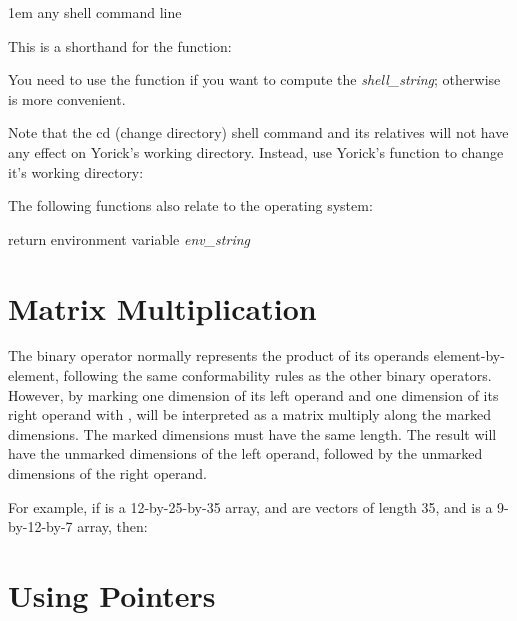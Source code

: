 \hglue1em \kbd{\$}any shell command line

This is a shorthand for the  function:


You need to use the  function if you want to compute the
{\it shell\_string}; otherwise \kbd{\$} is more convenient.

Note that the cd (change directory) shell command and its relatives
will not have any effect on Yorick's working directory.  Instead, use
Yorick's  function to change it's working directory:


The following functions also relate to the operating system:

     {return environment variable {\it env\_string\/}}

\shortcopyrightnotice

\section{Matrix Multiplication}

The \kbd{*} binary operator normally represents the product of its
operands element-by-element, following the same conformability rules
as the other binary operators.  However, by marking one dimension of
its left operand and one dimension of its right operand with \kbd{+},
\kbd{*} will be interpreted as a matrix multiply along the marked
dimensions.  The marked dimensions must have the same length.  The result
will have the unmarked dimensions of the left operand, followed by the
unmarked dimensions of the right operand.

For example, if  is a 12-by-25-by-35 array,  and  are
vectors of length 35, and  is a 9-by-12-by-7 array, then:


\section{Using Pointers}

